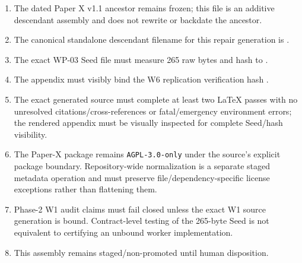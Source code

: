 \documentclass[
  10pt,
  letterpaper,
]{article}
\providecommand{\tightlist}{%
  \setlength{\itemsep}{0pt}\setlength{\parskip}{0pt}}
\begin{document}
\begin{enumerate}
\def\labelenumi{\arabic{enumi}.}
\tightlist
\item
  The dated Paper X v1.1 ancestor remains frozen; this file is an additive
  descendant assembly and does not rewrite or backdate the ancestor.
\item
  The canonical standalone descendant filename for this repair generation is
  \texttt{}.
\item
  The exact WP-03 Seed file must measure 265 raw bytes and hash to
  \texttt{}.
\item
  The appendix must visibly bind the W6 replication verification hash
  \texttt{}.
\item
  The exact generated source must complete at least two LaTeX passes with no
  unresolved citations/cross-references or fatal/emergency environment errors;
  the rendered appendix must be visually inspected for complete Seed/hash
  visibility.
\item
  The Paper-X package remains \nolinkurl{AGPL-3.0-only} under the source's
  explicit package boundary. Repository-wide normalization is a separate
  staged metadata operation and must preserve file/dependency-specific license
  exceptions rather than flattening them.
\item
  Phase-2 W1 audit claims must fail closed unless the exact W1 source generation
  is bound. Contract-level testing of the 265-byte Seed is not equivalent to
  certifying an unbound worker implementation.
\item
  This assembly remains staged/non-promoted until human disposition.
\end{enumerate}
\end{document}
